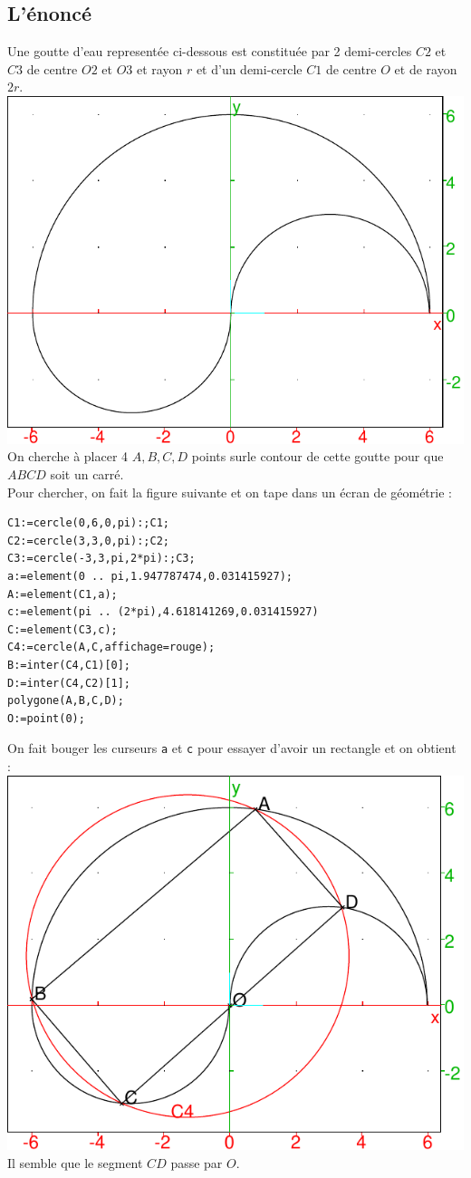 \documentclass[a4paper,11pt]{book}
\begin{document}
\subsection{L'\'enonc\'e}
Une goutte d'eau represent\'ee ci-dessous est constitu\'ee par 2 demi-cercles 
$C2$ et $C3$ de centre $O2$ et $O3$ et rayon $r$ et d'un demi-cercle $C1$ de 
centre $O$ et de rayon $2r$.\\ 
\includegraphics[width=\textwidth]{goutte}\\
On cherche \`a placer 4 $A,B,C,D$ points surle contour de cette goutte pour que
$ABCD$ soit un carr\'e.\\
Pour chercher, on fait la figure suivante et on tape dans un \'ecran de 
g\'eom\'etrie :
\begin{verbatim}
C1:=cercle(0,6,0,pi):;C1;
C2:=cercle(3,3,0,pi):;C2;
C3:=cercle(-3,3,pi,2*pi):;C3;
a:=element(0 .. pi,1.947787474,0.031415927);
A:=element(C1,a);
c:=element(pi .. (2*pi),4.618141269,0.031415927)
C:=element(C3,c);
C4:=cercle(A,C,affichage=rouge);
B:=inter(C4,C1)[0];
D:=inter(C4,C2)[1];
polygone(A,B,C,D);
O:=point(0);
\end{verbatim}
On fait bouger les curseurs {\tt a} et {\tt c} pour essayer d'avoir un 
rectangle et on obtient :
\includegraphics[width=\textwidth]{goutter}\\
Il semble que le segment $CD$ passe par $O$.\\
\end{document}
